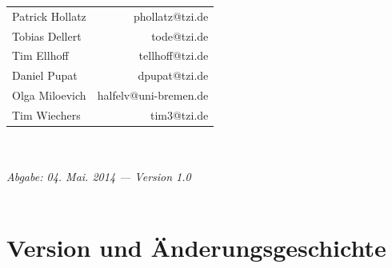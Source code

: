 \documentclass[fontsize=12pt,paper=a4,twoside]{scrartcl}
\begin{document}
  \begin{minipage}[H]{\textwidth}
  \begin{center}
  \sf
  \begin{tabular}{lr}
  Patrick Hollatz & phollatz@tzi.de  \\
  Tobias Dellert & tode@tzi.de \\
  Tim Ellhoff & tellhoff@tzi.de \\
  Daniel Pupat & dpupat@tzi.de \\
  Olga Miloevich & halfelv@uni-bremen.de \\  
  Tim Wiechers & tim3@tzi.de \\
  
  \end{tabular}
  \\ ~
  \vspace{2cm}
  \\
  \it Abgabe: 04. Mai. 2014 --- Version 1.0\\ ~
  \end{center}
  \end{minipage}



\newpage

  \thispagestyle{fancy}
  \fancyhead{}
  \fancyfoot{}
  \renewcommand{\headrulewidth}{0.4pt}
  \tableofcontents
  \listoffigures %
  \listoftables %

\newpage



\section*{Version und Änderungsgeschichte}
\end{document}
